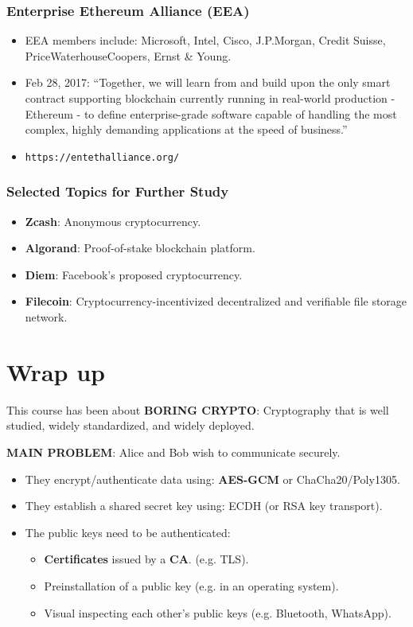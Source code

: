\documentclass[12pt,titlepage]{article}
\let\stdsection\section
\renewcommand\section{\clearpage\stdsection}
\begin{document}
\subsubsection{Enterprise Ethereum Alliance (EEA)}
\begin{itemize}
	\item EEA members include: Microsoft, Intel, Cisco, J.P.Morgan, Credit Suisse, PriceWaterhouseCoopers, Ernst \& Young.
	\item Feb 28, 2017: ``Together, we will learn from and build upon the only smart contract supporting blockchain currently running in real-world production - Ethereum - to define enterprise-grade software capable of handling the most complex, highly demanding applications at the speed of business.''
	\item \texttt{https://entethalliance.org/}
\end{itemize}
\subsubsection{Selected Topics for Further Study}
\begin{itemize}
	\item \textbf{Zcash}: Anonymous cryptocurrency.
	\item \textbf{Algorand}: Proof-of-stake blockchain platform.
	\item \textbf{Diem}: Facebook’s proposed cryptocurrency.
	\item \textbf{Filecoin}: Cryptocurrency-incentivized decentralized and verifiable file storage network.
\end{itemize}

\section{Wrap up}
This course has been about \textbf{BORING CRYPTO}: Cryptography that is well studied, widely standardized, and widely deployed.

\textbf{MAIN PROBLEM}: Alice and Bob wish to communicate securely.\begin{itemize}
	\item They encrypt/authenticate data using: \textbf{AES-GCM} or ChaCha20/Poly1305.
	\item They establish a shared secret key using: ECDH (or RSA key transport).
	\item The public keys need to be authenticated: \begin{itemize}
		\item \textbf{Certificates} issued by a \textbf{CA}. (e.g. TLS).
		\item Preinstallation of a public key (e.g. in an operating system).
		\item Visual inspecting each other’s public keys (e.g. Bluetooth, WhatsApp).
	\end{itemize}
\end{itemize}
\end{document}
